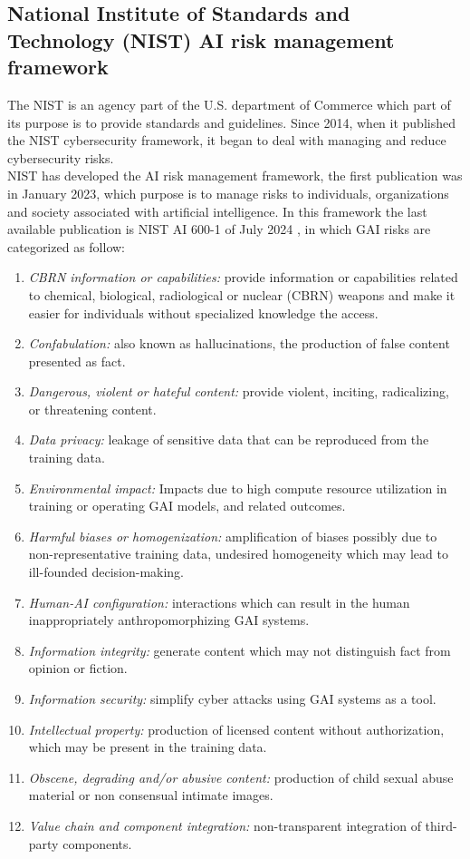 \documentclass[12pt]{article}
\begin{document}
    \subsection{National Institute of Standards and Technology (NIST) AI risk management framework}
The NIST is an agency part of the U.S. department of Commerce which part of its purpose is to provide standards and guidelines. Since 2014, when it published the NIST cybersecurity framework, it began to deal with managing and reduce cybersecurity risks.\\
NIST has developed the AI risk management framework, the first publication was in January 2023, which purpose is to manage risks to individuals, organizations and society associated with artificial intelligence.\cite{AIRiskManagementFramework}
In this framework the last available publication is NIST AI 600-1 of July 2024 \cite{NIST-AI-600-1}, in which GAI risks are categorized as follow:
\begin{enumerate}
	\item \textit{CBRN information or capabilities:} provide information or capabilities related to chemical, biological, radiological or nuclear (CBRN) weapons and make it easier for individuals without specialized knowledge the access.
	\item \textit{Confabulation:} also known as hallucinations, the production of false content presented as fact.
	\item \textit{Dangerous, violent or hateful content:} provide violent, inciting, radicalizing, or threatening content.
	\item \textit{Data privacy:} leakage of sensitive data that can be reproduced from the training data.
	\item \textit{Environmental impact:} Impacts due to high compute resource utilization in training or operating GAI models, and related outcomes.
	\item \textit{Harmful biases or homogenization:} amplification of biases possibly due to non-representative training data, undesired homogeneity which may lead to ill-founded decision-making.
	\item \textit{Human-AI configuration:} interactions which can result in the human inappropriately anthropomorphizing GAI systems.
	\item \textit{Information integrity:} generate content which may not distinguish fact from opinion or fiction.
	\item \textit{Information security:} simplify cyber attacks using GAI systems as a tool.
	\item \textit{Intellectual property:} production of licensed content without authorization, which may be present in the training data.
	\item \textit{Obscene, degrading and/or abusive content:} production of child sexual abuse material or non consensual intimate images.
	\item \textit{Value chain and component integration:} non-transparent integration of third-party components.
\end{enumerate}
     
\end{document}
